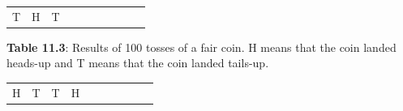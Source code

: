{{\begin{center}
\begin{tabular}[t]{|l|l|l|l|l|l|l|l|l|l|}
        T &
        H &
        T%
     \tabularnewline\cline{1-1}\cline{2-2}\cline{3-3}\cline{4-4}\cline{5-5}\cline{6-6}\cline{7-7}\cline{8-8}\cline{9-9}\cline{10-10}
    \end{tabular}
      \end{center}
    \begin{center}{\small\bfseries Table 11.3}: Results of 100 tosses of a fair coin. H means that the coin
landed heads-up and T means that the coin landed tails-up.\end{center}
          }{ %
        \begin{center}
      \label{m39373*uid56}
    \noindent
      \tablelasttail{}
      \begin{xtabular}[t]{|l|l|l|l|l|l|l|l|l|l|}\hline
        H &
        T &
        T &
        H &

\end{xtabular}
\end{center}}}
